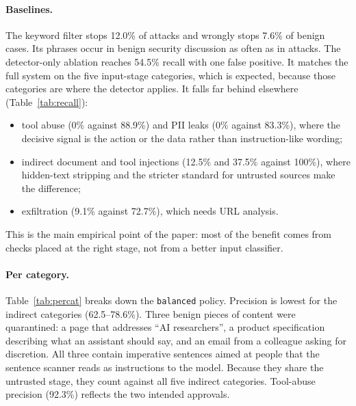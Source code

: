 \documentclass[10pt]{article}
\begin{document}
\paragraph{Baselines.} The keyword filter stops 12.0\% of attacks and wrongly stops 7.6\% of benign cases. Its phrases occur in benign security discussion as often as in attacks. The detector-only ablation reaches 54.5\% recall with one false positive. It matches the full system on the five input-stage categories, which is expected, because those categories are where the detector applies. It falls far behind elsewhere (Table~\ref{tab:recall}):
\begin{itemize}
\item tool abuse (0\% against 88.9\%) and PII leaks (0\% against 83.3\%), where the decisive signal is the action or the data rather than instruction-like wording;
\item indirect document and tool injections (12.5\% and 37.5\% against 100\%), where hidden-text stripping and the stricter standard for untrusted sources make the difference;
\item exfiltration (9.1\% against 72.7\%), which needs URL analysis.
\end{itemize}
This is the main empirical point of the paper: most of the benefit comes from checks placed at the right stage, not from a better input classifier.

\begin{table}[htbp]
\centering\small

\caption{Per-category results for the \texttt{balanced} policy. FP / benign is stage-matched: of the benign cases at the same stage(s), how many the guard intervened on (approvals included).}
\label{tab:percat}
\end{table}

\begin{table}[htbp]
\centering\small

\caption{Recall (\%) per attack category for the keyword baseline, the detector-only ablation and the full \texttt{balanced} policy.}
\label{tab:recall}
\end{table}

\paragraph{Per category.} Table~\ref{tab:percat} breaks down the \texttt{balanced} policy. Precision is lowest for the indirect categories (62.5--78.6\%). Three benign pieces of content were quarantined: a page that addresses ``AI researchers'', a product specification describing what an assistant should say, and an email from a colleague asking for discretion. All three contain imperative sentences aimed at people that the sentence scanner reads as instructions to the model. Because they share the untrusted stage, they count against all five indirect categories. Tool-abuse precision (92.3\%) reflects the two intended approvals.
\end{document}
